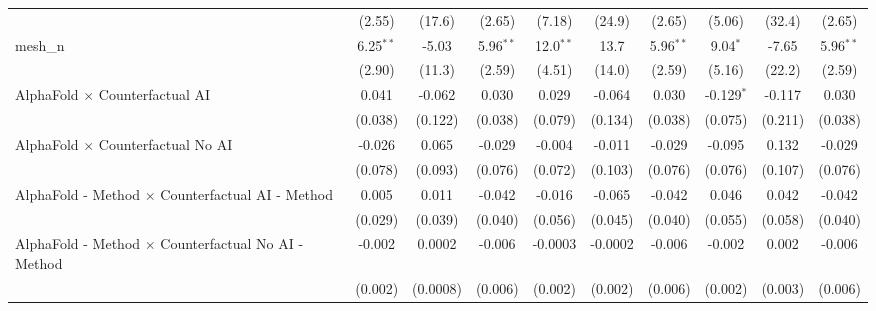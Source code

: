 \begin{tabular}{lccccccccc}
                                                               & (2.55)        & (17.6)         & (2.65)        & (7.18)        & (24.9)        & (2.65)        & (5.06)        & (32.4)         & (2.65)\\   
   mesh\_n                                                     & 6.25$^{**}$   & -5.03          & 5.96$^{**}$   & 12.0$^{**}$   & 13.7          & 5.96$^{**}$   & 9.04$^{*}$    & -7.65          & 5.96$^{**}$\\   
                                                               & (2.90)        & (11.3)         & (2.59)        & (4.51)        & (14.0)        & (2.59)        & (5.16)        & (22.2)         & (2.59)\\   
   AlphaFold $\times$ Counterfactual AI                        & 0.041         & -0.062         & 0.030         & 0.029         & -0.064        & 0.030         & -0.129$^{*}$  & -0.117         & 0.030\\   
                                                               & (0.038)       & (0.122)        & (0.038)       & (0.079)       & (0.134)       & (0.038)       & (0.075)       & (0.211)        & (0.038)\\   
   AlphaFold $\times$ Counterfactual No AI                     & -0.026        & 0.065          & -0.029        & -0.004        & -0.011        & -0.029        & -0.095        & 0.132          & -0.029\\   
                                                               & (0.078)       & (0.093)        & (0.076)       & (0.072)       & (0.103)       & (0.076)       & (0.076)       & (0.107)        & (0.076)\\   
   AlphaFold - Method $\times$ Counterfactual AI - Method      & 0.005         & 0.011          & -0.042        & -0.016        & -0.065        & -0.042        & 0.046         & 0.042          & -0.042\\   
                                                               & (0.029)       & (0.039)        & (0.040)       & (0.056)       & (0.045)       & (0.040)       & (0.055)       & (0.058)        & (0.040)\\   
   AlphaFold - Method $\times$ Counterfactual No AI - Method   & -0.002        & 0.0002         & -0.006        & -0.0003       & -0.0002       & -0.006        & -0.002        & 0.002          & -0.006\\   
                                                               & (0.002)       & (0.0008)       & (0.006)       & (0.002)       & (0.002)       & (0.006)       & (0.002)       & (0.003)        & (0.006)\\   

\end{tabular}
